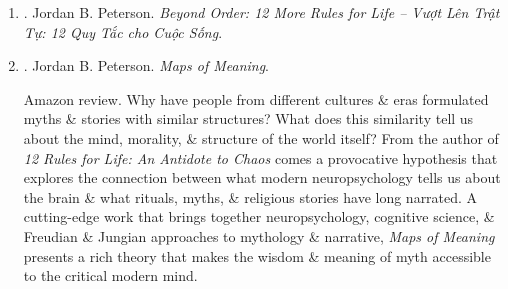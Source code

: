 \documentclass{article}
\begin{document}
\begin{enumerate}
	\item \cite{Peterson_beyond_order_VN}. {\sc Jordan B. Peterson}. {\it Beyond Order: 12 More Rules for Life -- Vượt Lên Trật Tự: 12 Quy Tắc cho Cuộc Sống}.\hfill{\sf[done]}

	\item \cite{Peterson_map_meaning}. {\sc Jordan B. Peterson}. {\it Maps of Meaning}. {}\hfill{\sf[reading]}

	{\sf Amazon review.} Why have people from different cultures \& eras formulated myths \& stories with similar structures? What does this similarity tell us about the mind, morality, \& structure of the world itself? From the author of {\it12 Rules for Life: An Antidote to Chaos} comes a provocative hypothesis that explores the connection between what modern neuropsychology tells us about the brain \& what rituals, myths, \& religious stories have long narrated. A cutting-edge work that brings together neuropsychology, cognitive science, \& Freudian \& Jungian approaches to mythology \& narrative, {\it Maps of Meaning} presents a rich theory that makes the wisdom \& meaning of myth accessible to the critical modern mind.


\end{enumerate}
\end{document}
